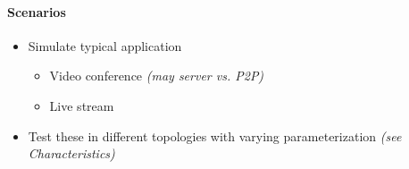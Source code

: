 \paragraph{Scenarios} %
\label{par:Scenarios}
\begin{itemize}
    \item Simulate typical application
    \begin{itemize}
        \item Video conference \textit{(may server vs. P2P)}
        \item Live stream
    \end{itemize}
    \item Test these in different topologies with varying parameterization
        \textit{(see Characteristics)}
\end{itemize}
